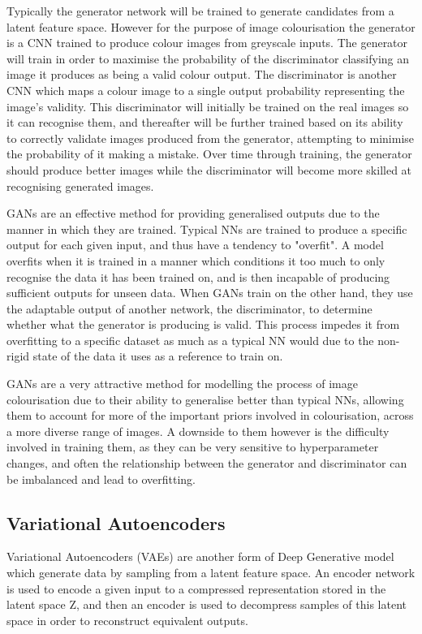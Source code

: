 \documentclass{l4proj}
\begin{document}
Typically the generator network will be trained to generate candidates from a latent feature space. However for the purpose of image colourisation the generator is a CNN trained to produce colour images from greyscale inputs. The generator will train in order to maximise the probability of the discriminator classifying an image it produces as being a valid colour output. The discriminator is another CNN which maps a colour image to a single output probability representing the image's validity. This discriminator will initially be trained on the real images so it can recognise them, and thereafter will be further trained based on its ability to correctly validate images produced from the generator, attempting to minimise the probability of it making a mistake. Over time through training, the generator should produce better images while the discriminator will become more skilled at recognising generated images.

GANs are an effective method for providing generalised outputs due to the manner in which they are trained. Typical NNs are trained to produce a specific output for each given input, and thus have a tendency to "overfit". A model overfits when it is trained in a manner which conditions it too much to only recognise the data it has been trained on, and is then incapable of producing sufficient outputs for unseen data. When GANs train on the other hand, they use the adaptable output of another network, the discriminator, to determine whether what the generator is producing is valid. This process impedes it from overfitting to a specific dataset as much as a typical NN would due to the non-rigid state of the data it uses as a reference to train on. 

GANs are a very attractive method for modelling the process of image colourisation due to their ability to generalise better than typical NNs, allowing them to account for more of the important priors involved in colourisation, across a more diverse range of images. A downside to them however is the difficulty involved in training them, as they can be very sensitive to hyperparameter changes, and often the relationship between the generator and discriminator can be imbalanced and lead to overfitting. 
\subsection{Variational Autoencoders}
\label{vae}
Variational Autoencoders (VAEs) are another form of Deep Generative model which generate data by sampling from a latent feature space. An encoder network is used to encode a given input to a compressed representation stored in the latent space Z, and then an encoder is used to decompress samples of this latent space in order to reconstruct equivalent outputs\cite{VAE}.
\end{document}
